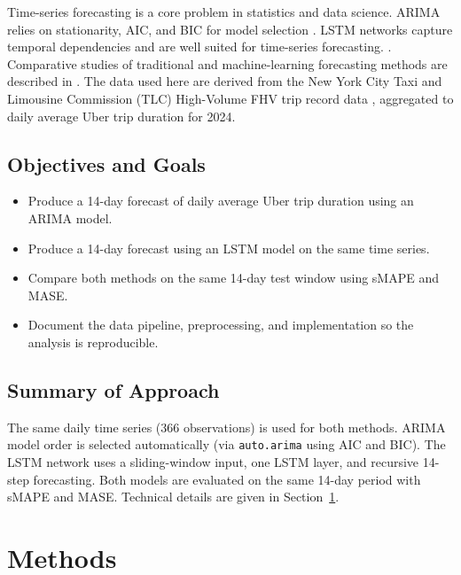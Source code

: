 \documentclass[12pt, a4paper]{article}
\begin{document}
Time-series forecasting is a core problem in statistics and data science. ARIMA relies on stationarity, AIC, and BIC for model selection \cite{forecast_auto_arima,hyndman2006}. LSTM networks capture temporal dependencies and are well suited for time-series forecasting. \cite{keras_r,keras_timeseries}. Comparative studies of traditional and machine-learning forecasting methods are described in \cite{prabhat2024}. The data used here are derived from the New York City Taxi and Limousine Commission (TLC) High-Volume FHV trip record data \cite{nyctlc2024}, aggregated to daily average Uber trip duration for 2024.

\subsection{Objectives and Goals}

\begin{itemize}
\item Produce a 14-day forecast of daily average Uber trip duration using an ARIMA model.
\item Produce a 14-day forecast using an LSTM model on the same time series.
\item Compare both methods on the same 14-day test window using sMAPE and MASE.
\item Document the data pipeline, preprocessing, and implementation so the analysis is reproducible.
\end{itemize}

\subsection{Summary of Approach}

The same daily time series (366 observations) is used for both methods. ARIMA model order is selected automatically (via \texttt{auto.arima} using AIC and BIC). The LSTM network uses a sliding-window input, one LSTM layer, and recursive 14-step forecasting. Both models are evaluated on the same 14-day period with sMAPE and MASE. Technical details are given in Section~\ref{sec:methods}.

\section{Methods}\label{sec:methods}
\end{document}

